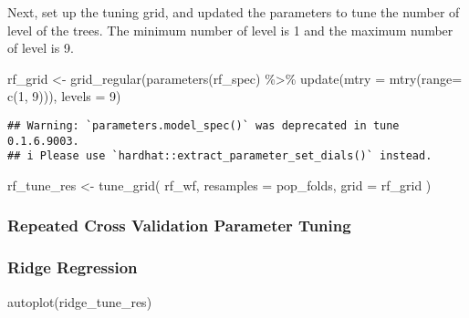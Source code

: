 \documentclass[
]{article}
\newenvironment{Shaded}{\begin{snugshade}}{\end{snugshade}}
\newcommand{\AttributeTok}[1]{\textcolor[rgb]{0.77,0.63,0.00}{#1}}
\newcommand{\DecValTok}[1]{\textcolor[rgb]{0.00,0.00,0.81}{#1}}
\newcommand{\FunctionTok}[1]{\textcolor[rgb]{0.00,0.00,0.00}{#1}}
\newcommand{\NormalTok}[1]{#1}
\newcommand{\OtherTok}[1]{\textcolor[rgb]{0.56,0.35,0.01}{#1}}
\newcommand{\SpecialCharTok}[1]{\textcolor[rgb]{0.00,0.00,0.00}{#1}}
\begin{document}
Next, set up the tuning grid, and updated the parameters to tune the
number of level of the trees. The minimum number of level is 1 and the
maximum number of level is 9.

\begin{Shaded}
\begin{Highlighting}[]
\NormalTok{rf\_grid }\OtherTok{\textless{}{-}} \FunctionTok{grid\_regular}\NormalTok{(}\FunctionTok{parameters}\NormalTok{(rf\_spec) }\SpecialCharTok{\%\textgreater{}\%}
 \FunctionTok{update}\NormalTok{(}\AttributeTok{mtry =} \FunctionTok{mtry}\NormalTok{(}\AttributeTok{range=} \FunctionTok{c}\NormalTok{(}\DecValTok{1}\NormalTok{, }\DecValTok{9}\NormalTok{))), }\AttributeTok{levels =} \DecValTok{9}\NormalTok{)}
\end{Highlighting}
\end{Shaded}

\begin{verbatim}
## Warning: `parameters.model_spec()` was deprecated in tune 0.1.6.9003.
## i Please use `hardhat::extract_parameter_set_dials()` instead.
\end{verbatim}

\begin{Shaded}
\begin{Highlighting}[]
\NormalTok{rf\_tune\_res }\OtherTok{\textless{}{-}} \FunctionTok{tune\_grid}\NormalTok{(}
\NormalTok{  rf\_wf, }
  \AttributeTok{resamples =}\NormalTok{ pop\_folds, }
  \AttributeTok{grid =}\NormalTok{ rf\_grid}
\NormalTok{)}
\end{Highlighting}
\end{Shaded}

\hypertarget{repeated-cross-validation-parameter-tuning}{%
\subsubsection{Repeated Cross Validation Parameter
Tuning}\label{repeated-cross-validation-parameter-tuning}}

\hypertarget{ridge-regression-1}{%
\subsubsection{Ridge Regression}\label{ridge-regression-1}}

\begin{Shaded}
\begin{Highlighting}[]
\FunctionTok{autoplot}\NormalTok{(ridge\_tune\_res)}
\end{Highlighting}
\end{Shaded}
\end{document}

